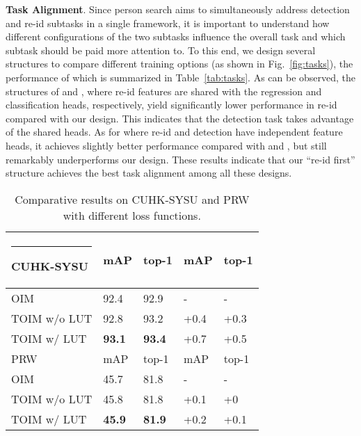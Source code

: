 \documentclass[journal]{IEEEtran}
\makeatletter
\newcommand{\thickhline}{\noalign {\ifnum 0=`}\fi \hrule height 1pt
    \futurelet \reserved@a \@xhline
}
\makeatother
\begin{document}
\textbf{Task Alignment}.
Since person search aims to simultaneously address detection and re-id subtasks in a single framework, it is important to understand how different configurations of the two subtasks influence the overall task and which subtask should be paid more attention to. To this end, we design several structures to compare different training options (as shown in Fig.~\ref{fig:tasks}), the performance of which is summarized in Table~\ref{tab:tasks}. As can be observed, the structures of  and , where re-id features are shared with the regression and classification heads, respectively, yield significantly lower performance in re-id compared with our design. This indicates that the detection task takes advantage of the shared heads. As for  where re-id and detection have independent feature heads, it achieves slightly better performance compared with  and , but still remarkably underperforms our design. 
These results indicate that our ``re-id first'' structure achieves the best task alignment among all these designs.



\begin{table}[t]
\small
\centering
\begin{tabular}{p{2.4cm}|p{0.8cm}<{\centering}p{0.8cm}<{\centering}|p{1.1cm}<{\centering}p{1.2cm}<{\centering}}
\hline\thickhline
\rowcolor{mygray} 
{CUHK-SYSU}  & mAP & top-1  &  mAP  &  top-1  \\  \hline \hline     
OIM
   & 92.4   & 92.9       & -   & -  \\
TOIM w/o LUT  & 92.8   & 93.2       & +0.4   & +0.3   \\ 
TOIM  w/ LUT  &\textbf{93.1} & \textbf{93.4} & +0.7    & +0.5\\\hline
\rowcolor{mygray} 
{PRW}  & mAP & top-1  &  mAP  &  top-1  \\  \hline \hline     
OIM
   & 45.7   & 81.8       & -   & -  \\
TOIM w/o LUT  & 45.8   & 81.8       & +0.1   & +0   \\ 
TOIM  w/ LUT  &\textbf{45.9} & \textbf{81.9} & +0.2    & +0.1\\\hline
\end{tabular}
\caption{Comparative results on CUHK-SYSU and PRW with different loss functions. }
\label{tab:toim}
\end{table}
\end{document}
